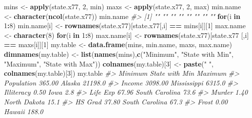 \documentclass[
]{book}
\newenvironment{Shaded}{\begin{snugshade}}{\end{snugshade}}
\newcommand{\CommentTok}[1]{\textcolor[rgb]{0.56,0.35,0.01}{\textit{#1}}}
\newcommand{\ControlFlowTok}[1]{\textcolor[rgb]{0.13,0.29,0.53}{\textbf{#1}}}
\newcommand{\DecValTok}[1]{\textcolor[rgb]{0.00,0.00,0.81}{#1}}
\newcommand{\FunctionTok}[1]{\textcolor[rgb]{0.13,0.29,0.53}{\textbf{#1}}}
\newcommand{\NormalTok}[1]{#1}
\newcommand{\OtherTok}[1]{\textcolor[rgb]{0.56,0.35,0.01}{#1}}
\newcommand{\SpecialCharTok}[1]{\textcolor[rgb]{0.81,0.36,0.00}{\textbf{#1}}}
\newcommand{\StringTok}[1]{\textcolor[rgb]{0.31,0.60,0.02}{#1}}
\begin{document}
\begin{Shaded}
\begin{Highlighting}[]
\NormalTok{mins }\OtherTok{\textless{}{-}} \FunctionTok{apply}\NormalTok{(state.x77, }\DecValTok{2}\NormalTok{, min)}
\NormalTok{maxs }\OtherTok{\textless{}{-}} \FunctionTok{apply}\NormalTok{(state.x77, }\DecValTok{2}\NormalTok{, max)}
\NormalTok{min.name }\OtherTok{\textless{}{-}} \FunctionTok{character}\NormalTok{(}\FunctionTok{ncol}\NormalTok{(state.x77))}
\NormalTok{min.name}
\CommentTok{\#\textgreater{} [1] "" "" "" "" "" "" "" ""}
\ControlFlowTok{for}\NormalTok{(i }\ControlFlowTok{in} \DecValTok{1}\SpecialCharTok{:}\DecValTok{8}\NormalTok{) min.name[i] }\OtherTok{\textless{}{-}} \FunctionTok{rownames}\NormalTok{(state.x77)[state.x77[,i] }\SpecialCharTok{==}\NormalTok{ mins[i]][}\DecValTok{1}\NormalTok{]}
\NormalTok{max.name }\OtherTok{\textless{}{-}} \FunctionTok{character}\NormalTok{(}\DecValTok{8}\NormalTok{)}
\ControlFlowTok{for}\NormalTok{(i }\ControlFlowTok{in} \DecValTok{1}\SpecialCharTok{:}\DecValTok{8}\NormalTok{) max.name[i] }\OtherTok{\textless{}{-}} \FunctionTok{rownames}\NormalTok{(state.x77)[state.x77 [,i] }\SpecialCharTok{==}\NormalTok{ maxs[i]][}\DecValTok{1}\NormalTok{]}
\NormalTok{my.table }\OtherTok{\textless{}{-}} \FunctionTok{data.frame}\NormalTok{(mins, min.name, maxs, max.name)}
\FunctionTok{dimnames}\NormalTok{(my.table) }\OtherTok{\textless{}{-}} \FunctionTok{list}\NormalTok{(}\FunctionTok{names}\NormalTok{(mins),}\FunctionTok{c}\NormalTok{(}\StringTok{"Minimum"}\NormalTok{, }
                                         \StringTok{"State with Min"}\NormalTok{,}
                                         \StringTok{"Maximum"}\NormalTok{,}
                                         \StringTok{"State with Max"}\NormalTok{))}
\FunctionTok{colnames}\NormalTok{(my.table)[}\DecValTok{3}\NormalTok{] }\OtherTok{\textless{}{-}} \FunctionTok{paste}\NormalTok{(}\StringTok{"     "}\NormalTok{, }\FunctionTok{colnames}\NormalTok{(my.table)[}\DecValTok{3}\NormalTok{])}
\NormalTok{my.table}
\CommentTok{\#\textgreater{}            Minimum State with Min       Maximum}
\CommentTok{\#\textgreater{} Population  365.00         Alaska       21198.0}
\CommentTok{\#\textgreater{} Income     3098.00    Mississippi        6315.0}
\CommentTok{\#\textgreater{} Illiteracy    0.50           Iowa           2.8}
\CommentTok{\#\textgreater{} Life Exp     67.96 South Carolina          73.6}
\CommentTok{\#\textgreater{} Murder        1.40   North Dakota          15.1}
\CommentTok{\#\textgreater{} HS Grad      37.80 South Carolina          67.3}
\CommentTok{\#\textgreater{} Frost         0.00         Hawaii         188.0}

\end{Highlighting}
\end{Shaded}
\end{document}

